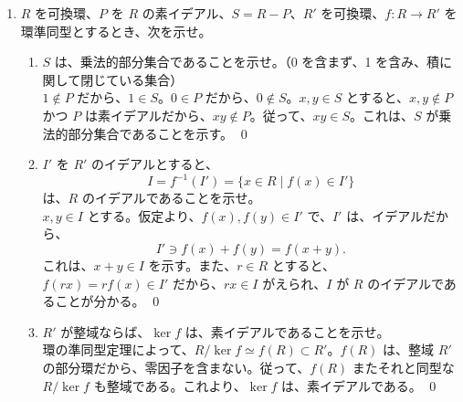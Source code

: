 \begin{enumerate}
\begin{enumerate}
     \item $R$ を整域と仮定するとき、$U(R[x]) = U(R)$ であることを示せ。\\
     \sol
     $f(x), g(x)\in R[x]$ とし、$\deg f(x)g(x) = 1$ とすると、
     $$0 = \deg 1 = \deg f(x)g(x) = \deg f(x) + \deg g(x)$$
     だから、$\deg f(x) = \deg g(x) = 0$。これより、$f(x), g(x) \in R$ を得る。従って、$U(R[x])\subset U(R)$。$U(R)\subset U(R[x])$ は明らかだから $U(R[x]) = U(R)$ を得る。
     \qed
     
     \item $R$ を整域とは仮定しないとき、$U(R[x]) = U(R)$ か。正しければ証明し、正しくなければ、反例を上げよ。\\
     \sol
     $R = \bZ_4$、$f(x) = 2x+1$ とする。
     $$(f(x))^2 = (2x+1)(2x+1) = 4x^2 + 4x + 1 = 1$$
     だから、$2x+1\in U(R[x])$。しかし、$2x+1\not\in R$ だから、$U(R[x]) \neq U(R)$ しかし $2x+1\not\in R$。
     \qed
     \end{enumerate}

\newpage 
\item $R$ を可換環、$P$ を $R$ の素イデアル、$S = R - P$、$R'$ を可換環、$f:R\to R'$ を環準同型とするとき、次を示せ。
     \begin{enumerate}
     \item $S$ は、乗法的部分集合であることを示せ。（0 を含まず、1 を含み、積に関して閉じている集合）\\
     \sol
     $1\not\in P$ だから、$1\in S$。$0\in P$ だから、$0\not\in S$。$x,y\in S$ とすると、$x,y\not\in P$ かつ $P$ は素イデアルだから、$xy\not\in P$。従って、$xy\in S$。これは、$S$ が乗法的部分集合であることを示す。
     \qed
     
     \item $I'$ を $R'$ のイデアルとすると、
     $$I = f^{-1}(I') = \{x\in R\mid f(x)\in I'\}$$
     は、$R$ のイデアルであることを示せ。\\
     \sol
     $x,y\in I$ とする。仮定より、$f(x), f(y)\in I'$ で、$I'$ は、イデアルだから、
     $$I'\ni f(x) + f(y) = f(x+y).$$
     これは、$x+y\in I$ を示す。また、$r\in R$ とすると、$f(rx) = rf(x)\in I'$ だから、$rx\in I$ がえられ、$I$ が $R$ のイデアルであることが分かる。
     \qed
     
     \item $R'$ が整域ならば、$\ker f$ は、素イデアルであることを示せ。\\
     \sol
     環の準同型定理によって、$R/\ker f\simeq f(R) \subset R'$。$f(R)$ は、整域 $R'$ の部分環だから、零因子を含まない。従って、$f(R)$ またそれと同型な $R/\ker f$ も整域である。これより、$\ker f$ は、素イデアルである。
     \qed
     

\end{enumerate}
\end{enumerate}
